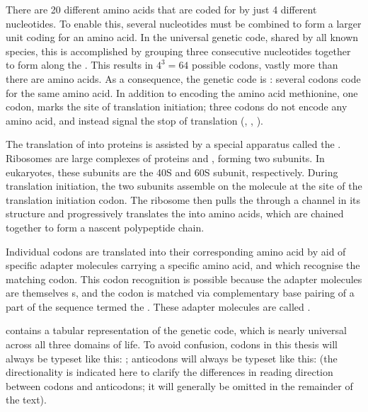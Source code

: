 There are \num{20} different amino acids that are coded for by just \num{4}
different nucleotides. To enable this, several nucleotides must be combined to
form a larger unit coding for an amino acid. In the universal genetic code,
shared by all known species, this is accomplished by grouping three consecutive
nucleotides together to form  along the \mrna. This results in
\(4^3 = 64\) possible codons, vastly more than there are amino acids. As a
consequence, the genetic code is : several codons code for
the same amino acid. In addition to encoding the amino acid methionine, one
codon,  marks the site of translation initiation; three codons do not
encode any amino acid, and instead signal the stop of translation (,
, ).

The translation of \mrna into proteins is assisted by a special apparatus called
the . Ribosomes are large complexes of proteins and \rrna,
forming two subunits. In eukaryotes, these subunits are the 40S and 60S subunit,
respectively. During translation initiation, the two subunits assemble on the
\mrna molecule at the site of the translation initiation codon. The ribosome
then pulls the \mrna through a channel in its structure and progressively
translates the \mrna into amino acids, which are chained together to form a
nascent polypeptide chain.

Individual codons are translated into their corresponding amino acid by aid of
specific adapter molecules carrying a specific amino acid, and which recognise
the matching codon. This codon recognition is possible because the adapter
molecules are themselves s, and the codon is matched via complementary
base pairing of a part of the \rna sequence termed the . These
adapter molecules are called .

 contains a tabular representation of the genetic code,
which is nearly universal across all three domains of life. To avoid confusion,
codons in this thesis will always be typeset like this: ;
anticodons will always be typeset like this:  (the
directionality is indicated here to clarify the differences in reading direction
between codons and anticodons; it will generally be omitted in the remainder of
the text).

